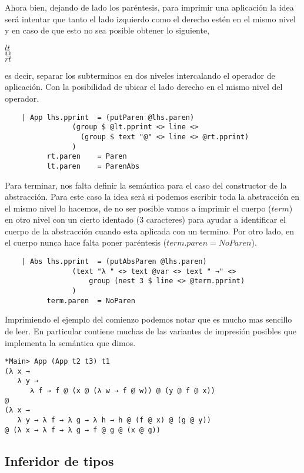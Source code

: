 \documentclass[a4paper,10pt]{article}
\begin{document}
Ahora bien, dejando de lado los paréntesis, para imprimir una aplicación la idea será
intentar que tanto el lado izquierdo como el derecho estén en el mismo nivel y en caso
de que esto no sea posible obtener lo siguiente,

\begin{center}
$lt$\\
$@$\\
$rt$
\end{center}

es decir, separar los subterminos en dos niveles intercalando el operador de aplicación.
Con la posibilidad de ubicar el lado derecho en el mismo nivel del operador.

\begin{lstlisting}    
    | App lhs.pprint  = (putParen @lhs.paren) 
                (group $ @lt.pprint <> line <> 
                  (group $ text "@" <> line <> @rt.pprint)
                )
          rt.paren    = Paren
          lt.paren    = ParenAbs
\end{lstlisting}    

Para terminar, nos falta definir la semántica para el caso del constructor de la
abstracción. Para este caso la idea será si podemos escribir toda la abstracción
en el mismo nivel lo hacemos, de no ser posible vamos a imprimir el cuerpo ($term$)
en otro nivel con un cierto identado (3 caracteres) para ayudar a identificar el
cuerpo de la abstracción cuando esta aplicada con un termino. Por otro lado, en el
cuerpo nunca hace falta poner paréntesis ($term.paren = NoParen$).

\begin{lstlisting}
    | Abs lhs.pprint  = (putAbsParen @lhs.paren)
                (text "λ " <> text @var <> text " →" <> 
                    group (nest 3 $ line <> @term.pprint)
                )
          term.paren  = NoParen
\end{lstlisting}

Imprimiendo el ejemplo del comienzo podemos notar que es mucho mas sencillo de
leer. En particular contiene muchas de las variantes de impresión posibles que
implementa la semántica que dimos.

\begin{verbatim}
*Main> App (App t2 t3) t1
(λ x →
   λ y →
      λ f → f @ (x @ (λ w → f @ w)) @ (y @ f @ x))
@
(λ x →
   λ y → λ f → λ g → λ h → h @ (f @ x) @ (g @ y))
@ (λ x → λ f → λ g → f @ g @ (x @ g))
\end{verbatim}

\subsection{Inferidor de tipos}
 
\end{document}

